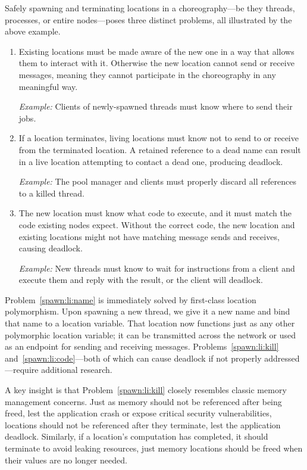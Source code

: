 Safely spawning and terminating locations in a choreography---be they threads, processes, or entire nodes---poses three distinct problems,
all illustrated by the above example.
\begin{enumerate}
  \item\label{spawn:li:name}
    Existing locations must be made aware of the new one in a way that allows them to interact with it.
    Otherwise the new location cannot send or receive messages, meaning they cannot participate in the choreography in any meaningful way.

    \textit{Example:} Clients of newly-spawned threads must know where to send their jobs.

  \item\label{spawn:li:kill}
    If a location terminates, living locations must know not to send to or receive from the terminated location.
    A retained reference to a dead name can result in a live location attempting to contact a dead one, producing deadlock.

    \textit{Example:} The pool manager and clients must properly discard all references to a killed thread.

  \item\label{spawn:li:code}
    The new location must know what code to execute, and it must match the code existing nodes expect.
    Without the correct code, the new location and existing locations might not have matching message sends and receives, causing deadlock.

    \textit{Example:} New threads must know to wait for instructions from a client and execute them
    and reply with the result, or the client will deadlock.
\end{enumerate}

Problem~\ref{spawn:li:name} is immediately solved by first-class location polymorphism.
Upon spawning a new thread, we give it a new name and bind that name to a location variable.
That location now functions just as any other polymorphic location variable;
it can be transmitted across the network or used as an endpoint for sending and receiving messages.
Problems~\ref{spawn:li:kill} and~\ref{spawn:li:code}---both of which can cause deadlock if not properly addressed---require additional research.

A key insight is that Problem~\ref{spawn:li:kill} closely resembles classic memory management concerns.
Just as memory should not be referenced after being freed, lest the application crash or expose critical security vulnerabilities,
locations should not be referenced after they terminate, lest the application deadlock.
Similarly, if a location's computation has completed, it should terminate to avoid leaking resources,
just memory locations should be freed when their values are no longer needed.

